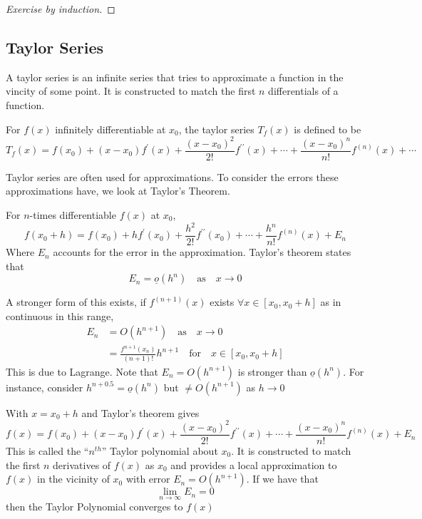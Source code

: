 \documentclass{article}
\begin{document}
\begin{proof}[Exercise by induction]
    
\end{proof}

\subsection{Taylor Series}
A taylor series is an infinite series that tries to approximate a function in the vincity of some point. It is constructed to match the first $n$ differentials of a function.

\begin{defi}
    For $f(x)$ infinitely differentiable at $x_0$, the taylor series $T_f(x)$ is defined to be
    \[
        T_f(x) = f(x_0) + (x - x_0)f^{\prime}(x) + \frac{(x - x_0)^2}{2!}f^{\prime\prime}(x) + \cdots + \frac{(x - x_0)^n}{n!}f^{(n)}(x) + \cdots
    \]
\end{defi}

Taylor series are often used for approximations. To consider the errors these approximations have, we look at Taylor's Theorem.

\begin{thm}
    For $n$-times differentiable $f(x)$ at $x_0$,
    \[
        f(x_0 + h) = f(x_0) + hf^{\prime}(x_0) + \frac{h^2}{2!}f^{\prime\prime}(x_0) + \cdots + \frac{h^n}{n!}f^{(n)}(x) + E_n
    \]
    Where $E_n$ accounts for the error in the approximation. Taylor's theorem states that
    \[
        E_n = \underline{o}(h^n) \quad \text{as} \quad x \rightarrow 0  
    \]
\end{thm}

A stronger form of this exists, if $f^{(n+1)}(x)$ exists $\forall x \in [x_0, x_0 + h]$ as in continuous in this range,
\begin{align*}
    E_n &= O(h^{n+1}) \quad \text{as} \quad x \rightarrow 0 \\
    &= \frac{f^{n+1}(x_n)}{(n+1)!}h^{n+1} \quad \text{for} \quad x \in [x_0, x_0 +h]
\end{align*}
This is due to Lagrange. Note that $E_n = O(h^{n+1})$ is stronger than $\underline{o}(h^n)$. For instance, consider $h^{n + 0.5} = \underline{o}(h^n)$ but $\neq O(h^{n+1})$ as $h \rightarrow 0$

\begin{defi}
    With $x = x_0 + h$ and Taylor's theorem gives
    \[
        f(x) = f(x_0) + (x - x_0)f^{\prime}(x) + \frac{(x - x_0)^2}{2!}f^{\prime\prime}(x) + \cdots + \frac{(x - x_0)^n}{n!}f^{(n)}(x) + E_n
    \]
    This is called the ``$n^{th}$'' Taylor polynomial about $x_0$. It is constructed to match the first $n$ derivatives of $f(x)$ as $x_0$ and provides a local approximation to $f(x)$ in the vicinity of $x_0$ with error $E_n = O(h^{n+1})$. If we have that
    \[
        \lim_{n \rightarrow \infty}{E_n} = 0  
    \]
    then the Taylor Polynomial converges to $f(x)$
\end{defi}
\end{document}

